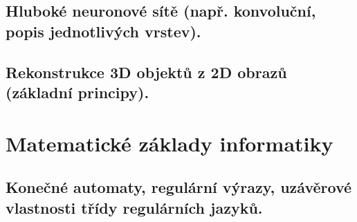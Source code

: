 \documentclass[openany]{book}
\begin{document}
\section{Hluboké neuronové sítě (např. konvoluční, popis jednotlivých vrstev).}

\section{Rekonstrukce 3D objektů z 2D obrazů (základní principy).}

\chapter{Matematické základy informatiky}

\section{Konečné automaty, regulární výrazy, uzávěrové vlastnosti třídy regulárních jazyků.}
\end{document}
